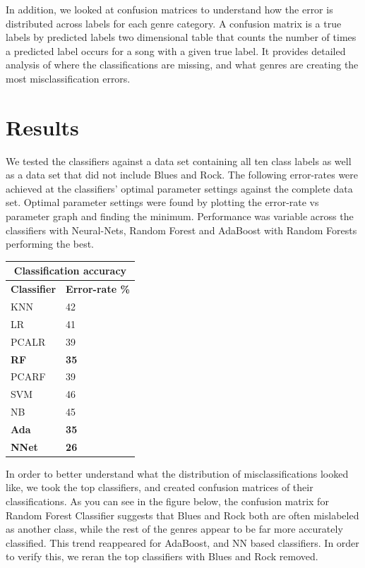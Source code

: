 \documentclass{article} %
\begin{document}
In addition, we looked at confusion matrices to understand how the error is distributed across labels for each genre category. A confusion matrix is a true labels by predicted labels two dimensional table that counts the number of times a predicted label occurs for a song with a given true label. It provides detailed analysis of where the classifications are missing, and what genres are creating the most misclassification errors.

\section{Results}
We tested the classifiers against a data set containing all ten class labels as well as a data set that did not include Blues and Rock. The following error-rates were achieved at the classifiers' optimal parameter settings against the complete data set. Optimal parameter settings were found by plotting the error-rate vs parameter graph and finding the minimum.  Performance was variable across the classifiers with Neural-Nets, Random Forest and AdaBoost with Random Forests performing the best. \newline
\begin{center}
	\begin{tabular}{ |p{2cm}|p{2.3cm}|}
		\hline
		\multicolumn{2}{|c|}{\textbf{Classification accuracy}} \\
		\hline
		\textbf{Classifier} & \textbf{Error-rate \%} \\
		\hline
		KNN & 42 \\
		LR & 41  \\
		PCALR & 39 \\
		\textbf{RF}    &  \textbf{35} \\
		PCARF & 39 \\
		SVM & 46 \\
		NB & 45 \\
		\textbf{Ada} & \textbf{35} \\
		\textbf{NNet} & \textbf{26} \\
		\hline
	\end{tabular}
\end{center}
In order to better understand what the distribution of misclassifications looked like, we took the top classifiers, and created confusion matrices of their classifications. As you can see in the figure below, the confusion matrix for Random Forest Classifier suggests that Blues and Rock both are often mislabeled as another class, while the rest of the genres appear to be far more accurately classified. This trend reappeared for AdaBoost, and NN based classifiers. In order to verify this, we reran the top classifiers with Blues and Rock removed.
\end{document}
